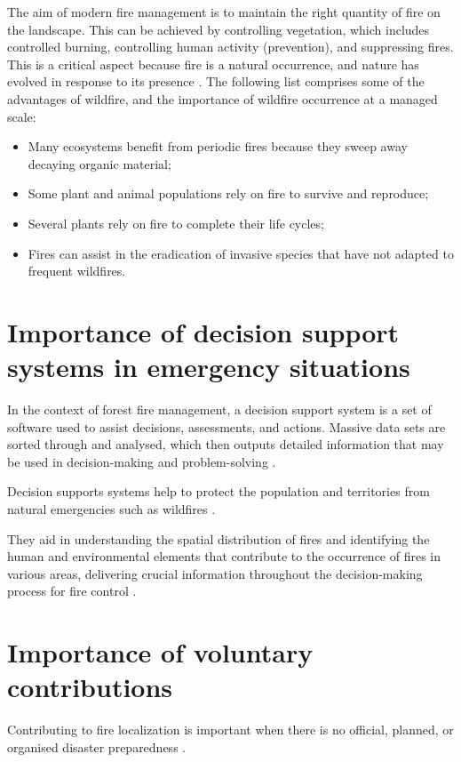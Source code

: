 The aim of modern fire management is to maintain the right quantity of fire on the landscape. This can be achieved by controlling vegetation, which includes controlled burning, controlling human activity (prevention), and suppressing fires. This is a critical aspect because fire is a natural occurrence, and nature has evolved in response to its presence \cite{NatGeo2023}. The following list comprises some of the advantages of wildfire, and the importance of wildfire occurrence at a managed scale:
\begin{itemize}
    \item Many ecosystems benefit from periodic fires because they sweep away decaying organic material;
    \item Some plant and animal populations rely on fire to survive and reproduce;
    \item Several plants rely on fire to complete their life cycles;
    \item Fires can assist in the eradication of invasive species that have not adapted to frequent wildfires.
\end{itemize}


\section{Importance of decision support systems in emergency situations}
In the context of forest fire management, a decision support system is a set of software used to assist decisions, assessments, and actions. Massive data sets are sorted through and analysed, which then outputs detailed information that may be used in decision-making and problem-solving \cite{sutton2020overview}.

Decision supports systems help to protect the population and territories from natural  emergencies such as wildfires \cite{Nemtinov_2021}.
 
They aid in understanding the spatial distribution of fires and identifying the human and environmental elements that contribute to the occurrence of fires in various areas, delivering crucial information throughout the decision-making process for fire control \cite{f14020170}.




\section{Importance of voluntary contributions}
Contributing to fire localization is important when there is no official, planned, or organised disaster preparedness \cite{smith2016spontaneous}.


